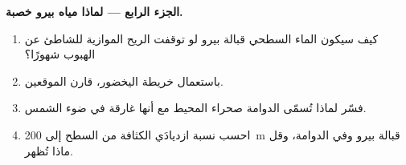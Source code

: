 \begin{problem}
\medskip
\noindent\textbf{الجزء الرابع --- لماذا مياه بيرو خصبة.}
\begin{enumerate}[resume]
  \item كيف سيكون الماء السطحي قبالة بيرو لو توقفت الريح الموازية للشاطئ عن الهبوب
        شهورًا؟
  \item باستعمال خريطة اليخضور، قارن الموقعين.
  \item فسّر لماذا تُسمّى الدوامة صحراء المحيط مع أنها غارقة في ضوء
        الشمس.
  \item احسب نسبة ازديادَي الكثافة من السطح إلى
        \qty{200}{m} قبالة بيرو وفي الدوامة، وقل ماذا تُظهر.
\end{enumerate}
\end{problem}

